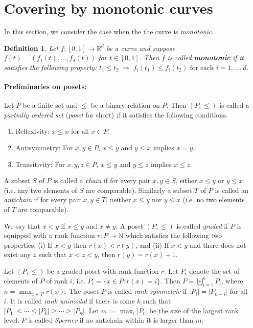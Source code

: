 \documentclass[
final
]{dmtcs-episciences}
\numberwithin{equation}{subsection}
\newtheorem{defn}{Definition}%
\begin{document}
\section{Covering by monotonic curves}\label{sec:monotone-cover}
\noindent
In this section, we consider the case when the the curve is \emph{monotonic}.
\begin{defn}
	Let $f:[0,1]\to\mathbb{R}^d$ be a curve and suppose $f(t)=(f_1(t),\ldots ,f_d(t))$ for $t\in [0,1]$. Then $f$ is called \textbf{monotonic} if it satisfies the following property: 
	$t_1\leq t_2 \; \Rightarrow \; f_i(t_1)\leq f_i(t_2) \text{ for    each } i=1,\ldots ,d.$ 
\end{defn} 


\paragraph*{Preliminaries on posets:} Let $P$ be a finite set and $\leq$ be a binary relation on $P$. Then $(P,\leq )$ is called a {\it partially ordered set} ({\it poset} for short) if it satisfies the following conditions.
\begin{enumerate}
	\item Reflexivity: $x\leq x$ for all $x\in P$.
	
	\item Antisymmetry: For $x,y\in P$, $x\leq y$ and $y\leq x$ implies $x=y$.
	
	\item Transitivity: For $x,y,z\in P$, $x\leq y$ and $y\leq z$ implies $x\leq z$.
\end{enumerate}

A subset $S$ of $P$ is called a {\it chain} if for every pair $x,y\in S$, either $x\leq y$ or $y\leq x$ (i.e. any two elements of $S$ are comparable). Similarly a subset $T$ of $P$ is called an {\it antichain} if for every pair $x,y\in T$, neither $x\leq y$ nor $y\leq x$ (i.e. no two elements of $T$ are comparable).

We say that $x<y$ if $x\leq y$ and $x\ne y$. A poset $(P,\leq )$ is called {\it graded} if $P$ is equipped with a rank function $r:P\to\mathbb{N}$ which satisfies the following two properties: (i) If $x < y$ then $r(x)<r(y)$, and (ii) If $x<y$ and there does not exist any $z$ such that $x<z<y$, then $r(y)=r(x)+1$.

Let $(P,\leq)$ be a graded poset with rank function $r$. Let $P_i$ denote the set of elements of $P$ of rank $i$, i.e. $P_i=\{x\in P: r(x)=i\}$. Then $P=\biguplus_{i=1}^n P_i$, where $n=\max_{x\in P}{r(x)}$. The poset $P$ is called {\it rank symmetric} if $|P_i|=|P_{n-i}|$ for all $i$. It is called {\it rank unimodal} if there is some $k$ such that $|P_1|\leq\cdots\leq |P_k|\geq\cdots\geq |P_n|$. Let $m:=\max_{i}|P_i|$ be the size of the largest rank level. $P$ is called {\it Sperner} if no antichain within it is larger than $m$. 
\end{document}
